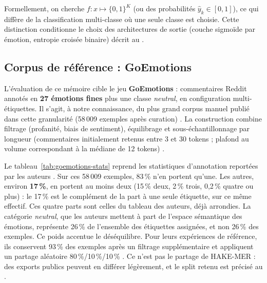 Formellement, on cherche $f : x \mapsto \{0,1\}^K$ (ou des
probabilités $\hat{y}_k \in [0,1]$), ce qui diffère de la
classification multi-classe où une seule classe est choisie. Cette
distinction conditionne le choix des architectures de sortie
(couche sigmoïde par émotion, entropie croisée binaire) décrit au
.

\subsection{Corpus de référence : GoEmotions}

L'évaluation de ce mémoire cible le jeu \textbf{GoEmotions}
\cite{demszky2020} : commentaires Reddit annotés en
\textbf{27 émotions fines} plus une classe \emph{neutral}, en
configuration multi-étiquettes. Il s'agit, à notre connaissance, du
plus grand corpus manuel publié dans cette granularité (58\,009
exemples après curation) \cite{demszky2020}. La construction combine
filtrage (profanité, biais de sentiment), équilibrage et
sous-échantillonnage par longueur (commentaires initialement retenus
entre 3 et 30 tokens ; plafond au volume correspondant à la médiane de
12 tokens) \cite{demszky2020}.

Le tableau~\ref{tab:goemotions-stats} reprend les statistiques
d'annotation reportées par les auteurs \cite{demszky2020}. Sur ces
58\,009 exemples, 83\,\% n'en portent qu'une. Les autres, environ
\textbf{17\,\%}, en portent au moins deux (15\,\% deux, 2\,\% trois,
0{,}2\,\% quatre ou plus) : le 17\,\% est le complément de la part à
une seule étiquette, sur ce même effectif. Ces quatre parts sont celles
du tableau des auteurs, déjà arrondies. La catégorie \emph{neutral},
que les auteurs mettent à part de l'espace sémantique des émotions,
représente 26\,\% de l'ensemble des étiquettes assignées, et non 26\,\%
des exemples. Ce poids accentue le déséquilibre. Pour leurs
expériences de référence, ils conservent 93\,\% des exemples après un
filtrage supplémentaire et appliquent un partage aléatoire
80\,\%/10\,\%/10\,\% \cite{demszky2020}. Ce n'est pas le partage de
HAKE-MER : des exports publics peuvent en différer légèrement, et le
split retenu est précisé au .

